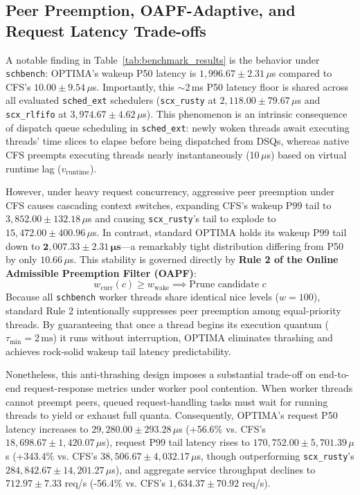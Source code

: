 \documentclass[conference]{IEEEtran}
\begin{document}
\subsection{Peer Preemption, OAPF-Adaptive, and Request Latency Trade-offs}
A notable finding in Table~\ref{tab:benchmark_results} is the behavior under \texttt{schbench}: OPTIMA's wakeup P50 latency is $1{,}996.67 \pm 2.31\,\mu$s compared to CFS's $10.00 \pm 9.54\,\mu$s. Importantly, this $\sim$2\,ms P50 latency floor is shared across all evaluated \texttt{sched\_ext} schedulers (\texttt{scx\_rusty} at $2{,}118.00 \pm 79.67\,\mu$s and \texttt{scx\_rlfifo} at $3{,}974.67 \pm 4.62\,\mu$s). This phenomenon is an intrinsic consequence of dispatch queue scheduling in \texttt{sched\_ext}: newly woken threads await executing threads' time slices to elapse before being dispatched from DSQs, whereas native CFS preempts executing threads nearly instantaneously (10\,$\mu$s) based on virtual runtime lag ($v_{\text{runtime}}$).

However, under heavy request concurrency, aggressive peer preemption under CFS causes cascading context switches, expanding CFS's wakeup P99 tail to $3{,}852.00 \pm 132.18\,\mu$s and causing \texttt{scx\_rusty}'s tail to explode to $15{,}472.00 \pm 400.96\,\mu$s. In contrast, standard OPTIMA holds its wakeup P99 tail down to $\mathbf{2{,}007.33 \pm 2.31\,\mu\text{s}}$---a remarkably tight distribution differing from P50 by only $10.66\,\mu$s. This stability is governed directly by \textbf{Rule 2 of the Online Admissible Preemption Filter (OAPF)}:
\begin{equation*}
w_{\mathrm{curr}}(c) \ge w_{\mathrm{wake}} \implies \text{Prune candidate } c
\end{equation*}
Because all \texttt{schbench} worker threads share identical nice levels ($w = 100$), standard Rule 2 intentionally suppresses peer preemption among equal-priority threads. By guaranteeing that once a thread begins its execution quantum ($\tau_{\min} = 2\,\text{ms}$) it runs without interruption, OPTIMA eliminates thrashing and achieves rock-solid wakeup tail latency predictability.

Nonetheless, this anti-thrashing design imposes a substantial trade-off on end-to-end request-response metrics under worker pool contention. When worker threads cannot preempt peers, queued request-handling tasks must wait for running threads to yield or exhaust full quanta. Consequently, OPTIMA's request P50 latency increases to $29{,}280.00 \pm 293.28\,\mu$s (+56.6\% vs. CFS's $18{,}698.67 \pm 1{,}420.07\,\mu$s), request P99 tail latency rises to $170{,}752.00 \pm 5{,}701.39\,\mu$s (+343.4\% vs. CFS's $38{,}506.67 \pm 4{,}032.17\,\mu$s, though outperforming \texttt{scx\_rusty}'s $284{,}842.67 \pm 14{,}201.27\,\mu$s), and aggregate service throughput declines to $712.97 \pm 7.33$ req/s (-56.4\% vs. CFS's $1{,}634.37 \pm 70.92$ req/s). 
\end{document}
